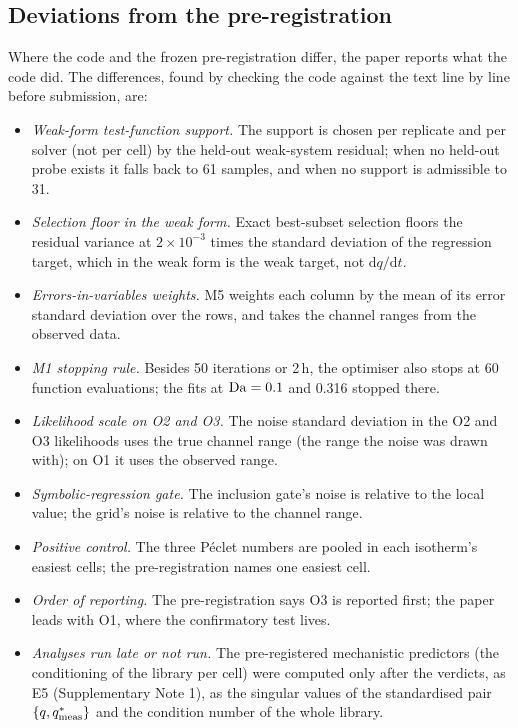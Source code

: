 \subsection*{Deviations from the pre-registration}
Where the code and the frozen pre-registration differ, the paper reports what the code did. The
differences, found by checking the code against the text line by line before submission, are:
\begin{itemize}
\item \emph{Weak-form test-function support.} The support is chosen per replicate and per solver
(not per cell) by the held-out weak-system residual; when no held-out probe exists it falls back to
61 samples, and when no support is admissible to 31.
\item \emph{Selection floor in the weak form.} Exact best-subset selection floors the residual
variance at $2\times10^{-3}$ times the standard deviation of the regression target, which in the
weak form is the weak target, not $\mathrm{d}q/\mathrm{d}t$.
\item \emph{Errors-in-variables weights.} M5 weights each column by the mean of its error standard
deviation over the rows, and takes the channel ranges from the observed data.
\item \emph{M1 stopping rule.} Besides 50 iterations or 2\,h, the optimiser also stops at 60
function evaluations; the fits at $\mathrm{Da} = 0.1$ and 0.316 stopped there.
\item \emph{Likelihood scale on O2 and O3.} The noise standard deviation in the O2 and O3
likelihoods uses the true channel range (the range the noise was drawn with); on O1 it uses the
observed range.
\item \emph{Symbolic-regression gate.} The inclusion gate's noise is relative to the local value;
the grid's noise is relative to the channel range.
\item \emph{Positive control.} The three P\'eclet numbers are pooled in each isotherm's easiest
cells; the pre-registration names one easiest cell.
\item \emph{Order of reporting.} The pre-registration says O3 is reported first; the paper leads
with O1, where the confirmatory test lives.
\item \emph{Analyses run late or not run.} The pre-registered mechanistic predictors (the
conditioning of the library per cell) were computed only after the verdicts, as E5 (Supplementary Note 1),
as the singular values of the standardised pair $\{q, q^{*}_{\mathrm{meas}}\}$ and the condition number of the whole library.

\end{itemize}
